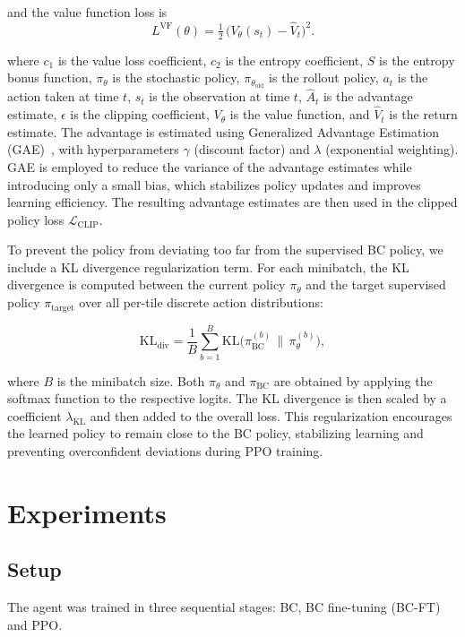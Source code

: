 \documentclass[10pt,twocolumn,letterpaper]{article}
\begin{document}
and the value function loss is
\begin{equation*}
L^{\text{VF}}(\theta) = \tfrac{1}{2}\,\big( V_\theta(s_t) - \hat{V}_t \big)^2.
\label{eq:ppo_value}
\end{equation*}


where $c_1$ is the value loss coefficient, $c_2$ is the entropy coefficient, $S$ is the entropy bonus function, $\pi_\theta$ is the stochastic policy, $\pi_{\theta_{\text{old}}}$ is the rollout policy, $a_t$ is the action taken at time $t$, $s_t$ is the observation at time $t$, $\hat{A}_t$ is the advantage estimate, $\epsilon$ is the clipping coefficient, $V_\theta$ is the value function, and $\hat{V}_t$ is the return estimate. The advantage is estimated using Generalized Advantage Estimation (GAE)~\cite{schulman2015high}, with hyperparameters $\gamma$ (discount factor) and $\lambda$ (exponential weighting). GAE is employed to reduce the variance of the advantage estimates while introducing only a small bias, which stabilizes policy updates and improves learning efficiency. The resulting advantage estimates are then used in the clipped policy loss $\mathcal{L}_{\text{CLIP}}$.

To prevent the policy from deviating too far from the supervised BC policy, we include a KL divergence regularization term. For each minibatch, the KL divergence is computed between the current policy $\pi_\theta$ and the target supervised policy $\pi_{\text{target}}$ over all per-tile discrete action distributions:

\[
\text{KL}_{\text{div}} = \frac{1}{B} \sum_{b=1}^{B} \text{KL}\Big(\pi_{\text{BC}}^{(b)} \,\|\, \pi_\theta^{(b)} \Big),
\]

where $B$ is the minibatch size. Both $\pi_\theta$ and $\pi_{\text{BC}}$ are obtained by applying the softmax function to the respective logits. The KL divergence is then scaled by a coefficient $\lambda_{\text{KL}}$ and then added to the overall loss. This regularization encourages the learned policy to remain close to the BC policy, stabilizing learning and preventing overconfident deviations during PPO training.

\section{Experiments}
\label{sec:experiments}

\subsection{Setup}
The agent was trained in three sequential stages: BC, BC fine-tuning (BC-FT) and PPO.
\end{document}
